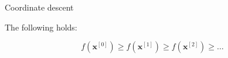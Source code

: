 \documentclass[11pt,compress,t,notes=noshow, xcolor=table]{beamer}
\begin{document}
\begin{vbframe}{Coordinate descent}
\begin{itemize}
\lz

The following holds:

$$
  f(\bm{x}^{[0]}) \geq f(\bm{x}^{[1]}) \geq f(\bm{x}^{[2]}) \geq \hdots
$$
\end{itemize}





%
%



\end{vbframe}
\end{document}
